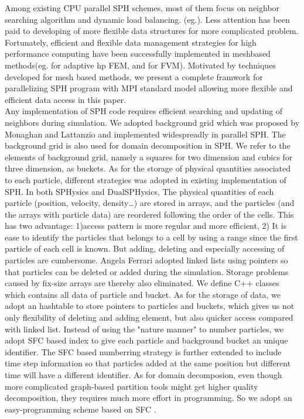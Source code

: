 \documentclass[10pt,a4paper]{article}
\begin{document}
Among existing CPU parallel SPH schemes, most of them focus on neighbor searching algorithm and dynamic load balancing.  (eg.\citep{ferrari2009new, crespo2015dualsphysics}). Less attention has been paid to developing of more flexible data structures for more complicated problem. 
Fortunately, efficient and flexible data management strategies for high performance computing have been successfully implemented in meshbased methods(eg. \citep{laszloffy2000simple} for adaptive hp FEM, and \citep{pitman2003computing, patra2005parallel} for FVM). Motivated by techniques developed for mesh based methods, we present a complete framwork for parallelizing SPH program with MPI standard model allowing more flexible and efficient data access in this paper.\\
Any implementation of SPH code requires efficient searching and updating of neighbors during simulation. We adopted background grid which was proposed by Monaghan and Lattanzio\citep{monaghan1985refined} and implemented widespreadly in parallel SPH. The background grid is also used for domain decomposition in SPH. We refer to the elements of background grid, namely a squares for two dimension and cubics for three dimension, as buckets. As for the storage of physical quantities associated to each particle, different strategies was adopted in existing implementation of SPH. 
In both SPHysics\citep{dominguez2011optimization} and DualSPHysics\citep{crespo2015dualsphysics}, The physical quantities of each particle (position, velocity, density…) are stored in arrays, and the particles (and the arrays with particle data) are reordered following the order of the cells. This has two advantage: 1)access pattern is more regular and more efficient, 2) It is ease to identify the particles that belongs to a cell by using a range since the first particle of each cell is known. But adding, deleting and especially accessing of particles are cumbersome. Angela Ferrari\citep{ferrari2009new} adopted linked lists using pointers so that particles can be deleted or added during the simulation. Storage problems caused by fix-size arrays are thereby also eliminated. We define C++ classes which contains all data of particle and bucket. As for the storage of data, we adopt an hashtable to store pointers to particles and buckets, which gives us not only flexibility of deleting and adding element, but also quicker access compared with linked list. Instead of using the "nature manner" to number particles, we adopt SFC based index to give each particle and background bucket an unique identifier. The SFC based numberring strategy is further extended to include time step information so that particles added at the same position but different time will have a different identifier. As for domain decomposion, even though more complicated graph-based partition tools\citep{biswas1999experiments} might get higher quality decomposition, they requires much more effort in programming. So we adopt an easy-programming scheme based on SFC \citep{patra1999efficient}.\\
\end{document}
